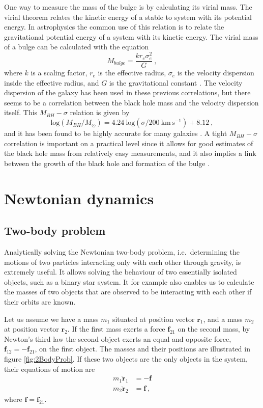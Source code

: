\documentclass[english, oneside]{HYgradu}
\begin{document}
One way to measure the mass of the bulge is by calculating its virial mass. The virial theorem relates the kinetic energy of a stable to system with its potential energy. In astrophysics the common use of this relation is to relate the gravitational potential energy of a system with its kinetic energy. The virial mass of a bulge can be calculated with the equation
\begin{equation}
M_{bulge} = \frac{k r_e \sigma^2_e}{G} \ ,
\end{equation}
where $k$ is a scaling factor, $r_e$ is the effective radius, $\sigma_e$ is the velocity dispersion inside the effective radius, and $G$ is the gravitational constant \citep{marconi:2003}. The velocity dispersion of the galaxy has been used in these previous correlations, but there seems to be a correlation between the black hole mass and the velocity dispersion itself. This $M_{BH} - \sigma$ relation is given by
\begin{equation}
\mathrm{log} (M_{BH}/M_{\odot}) = 4.24 \ \mathrm{log} ( \sigma / 200 \ \mathrm{km \, s^{-1}} ) + 8.12 \ , 
\end{equation}
and it has been found to be highly accurate for many galaxies \citep{gultekin:2009}.
A tight $M_{BH} - \sigma$ correlation is important on a practical level since it allows for good estimates of the black hole mass from relatively easy measurements, and it also implies a link between the growth of the black hole and formation of the bulge \citep{kormendy:2013}.

\section{Newtonian dynamics}

\subsection{Two-body problem}

Analytically solving the Newtonian two-body problem, i.e.\ determining the motions of two particles interacting only with each other through gravity, is extremely useful. It allows solving the behaviour of two essentially isolated objects, such as a binary star system. It for example also enables us to calculate the masses of two objects that are observed to be interacting with each other if their orbits are known.

Let us assume we have a mass $m_1$ situated at position vector $\mathbf{r}_1$, and a mass $m_2$ at position vector $\mathbf{r}_2$. If the first mass exerts a force $\mathbf{f}_{21}$ on the second mass, by Newton's third law the second object exerts an equal and opposite force, $\mathbf{f}_{12} = -\mathbf{f}_{21}$, on the first object. The masses and their positions are illustrated in figure \ref{fig:2BodyProb}. If these two objects are the only objects in the system, their equations of motion are
\begin{align}
m_1 \mathbf{\ddot{r}}_1 &= -\mathbf{f} \label{equ:eom1} \\
m_2 \mathbf{\ddot{r}}_2 &= \mathbf{f} \label{equ:eom2} \ ,
\end{align}
where $\mathbf{f} = \mathbf{f}_{21}$.
\end{document}
